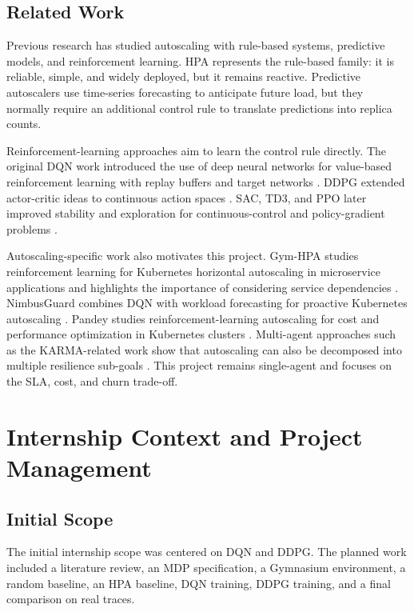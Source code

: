 \documentclass{rapportINPTCLOUD}
\begin{document}
\section{Related Work}

Previous research has studied autoscaling with rule-based systems, predictive models, and reinforcement learning. HPA represents the rule-based family: it is reliable, simple, and widely deployed, but it remains reactive. Predictive autoscalers use time-series forecasting to anticipate future load, but they normally require an additional control rule to translate predictions into replica counts.

Reinforcement-learning approaches aim to learn the control rule directly. The original DQN work introduced the use of deep neural networks for value-based reinforcement learning with replay buffers and target networks \cite{mnih2015}. DDPG extended actor-critic ideas to continuous action spaces \cite{lillicrap2016}. SAC, TD3, and PPO later improved stability and exploration for continuous-control and policy-gradient problems \cite{haarnoja2018,fujimoto2018,schulman2017}.

Autoscaling-specific work also motivates this project. Gym-HPA studies reinforcement learning for Kubernetes horizontal autoscaling in microservice applications and highlights the importance of considering service dependencies \cite{gymhpa}. NimbusGuard combines DQN with workload forecasting for proactive Kubernetes autoscaling \cite{nimbusguard}. Pandey studies reinforcement-learning autoscaling for cost and performance optimization in Kubernetes clusters \cite{pandey}. Multi-agent approaches such as the KARMA-related work show that autoscaling can also be decomposed into multiple resilience sub-goals \cite{soule2025karma}. This project remains single-agent and focuses on the SLA, cost, and churn trade-off.

\chapter{Internship Context and Project Management}
\label{chap:project-management}

\section{Initial Scope}

The initial internship scope was centered on DQN and DDPG. The planned work included a literature review, an MDP specification, a Gymnasium environment, a random baseline, an HPA baseline, DQN training, DDPG training, and a final comparison on real traces.
\end{document}
